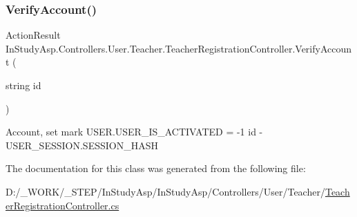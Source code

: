 \subsubsection{\texorpdfstring{Verify\+Account()}{VerifyAccount()}}
{\footnotesize\ttfamily Action\+Result In\+Study\+Asp.\+Controllers.\+User.\+Teacher.\+Teacher\+Registration\+Controller.\+Verify\+Account (\begin{DoxyParamCaption}\item[{string}]{id }\end{DoxyParamCaption})}

Account, set mark U\+S\+E\+R.\+U\+S\+E\+R\+\_\+\+I\+S\+\_\+\+A\+C\+T\+I\+V\+A\+T\+ED = -\/1 id -\/ U\+S\+E\+R\+\_\+\+S\+E\+S\+S\+I\+O\+N.\+S\+E\+S\+S\+I\+O\+N\+\_\+\+H\+A\+SH 

The documentation for this class was generated from the following file\+:\begin{DoxyCompactItemize}
\item 
D\+:/\+\_\+\+W\+O\+R\+K/\+\_\+\+S\+T\+E\+P/\+In\+Study\+Asp/\+In\+Study\+Asp/\+Controllers/\+User/\+Teacher/\hyperlink{_teacher_registration_controller_8cs}{Teacher\+Registration\+Controller.\+cs}\end{DoxyCompactItemize}

